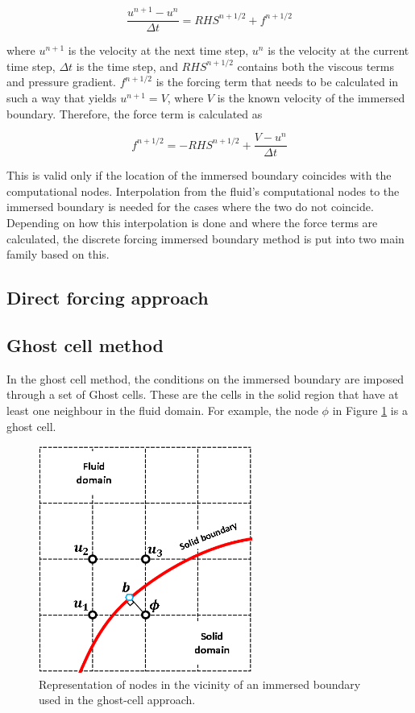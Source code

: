 \begin{equation}
	\frac{u^{n+1} - u^n}{\Delta t} = RHS^{n+1/2} + f^{n+1/2}
\end{equation}

where $u^{n+1}$ is the velocity at the next time step, $u^n$ is the velocity at the current time step, $\Delta t$ is the time step, and $RHS^{n+1/2}$ contains both the viscous terms and pressure gradient. $f^{n+1/2}$ is the forcing term that needs to be calculated in such a way that yields $u^{n+1} = V$, where $V$ is the known velocity of the immersed boundary. Therefore, the force term is calculated as

\begin{equation}
	f^{n+1/2} = -RHS^{n+1/2} + \frac{V - u^n}{\Delta t}
\end{equation}

This is valid only if the location of the immersed boundary coincides with the computational nodes. Interpolation from the fluid's computational nodes to the immersed boundary is needed for the cases where the two do not coincide. Depending on how this interpolation is done and where the force terms are calculated, the discrete forcing immersed boundary method is put into two main family based on this.

\subsection{Direct forcing approach}


\subsection{Ghost cell method}
In the ghost cell method, the conditions on the immersed boundary are imposed through a set of Ghost cells. These are the cells in the solid region that have at least one neighbour in the fluid domain. For example, the node $\phi$ in Figure \ref{fig:C3_ghostCell} is a ghost cell.

\begin{figure}[H]
	\centering
	\includegraphics[width=7.00cm]{Chapter_3/figure/discrete_forcing_approach.png}
	\caption{Representation of nodes in the vicinity of an immersed boundary used in the ghost-cell approach.}
	\label{fig:C3_ghostCell}
\end{figure}

